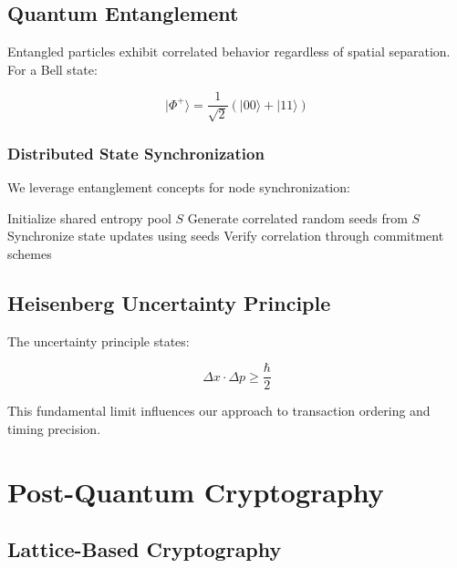 \documentclass[11pt,a4paper]{article}
\begin{document}
\subsection{Quantum Entanglement}

Entangled particles exhibit correlated behavior regardless of spatial separation. For a Bell state:

\begin{equation}
|\Phi^+\rangle = \frac{1}{\sqrt{2}}(|00\rangle + |11\rangle)
\end{equation}

\subsubsection{Distributed State Synchronization}

We leverage entanglement concepts for node synchronization:

\begin{algorithm}
\caption{Quantum-Inspired State Synchronization}
\begin{algorithmic}
\STATE Initialize shared entropy pool $S$
    \STATE Generate correlated random seeds from $S$
    \STATE Synchronize state updates using seeds
    \STATE Verify correlation through commitment schemes
\ENDFOR
\end{algorithmic}
\end{algorithm}

\subsection{Heisenberg Uncertainty Principle}

The uncertainty principle states:

\begin{equation}
\Delta x \cdot \Delta p \geq \frac{\hbar}{2}
\end{equation}

This fundamental limit influences our approach to transaction ordering and timing precision.

\section{Post-Quantum Cryptography}

\subsection{Lattice-Based Cryptography}
\end{document}
